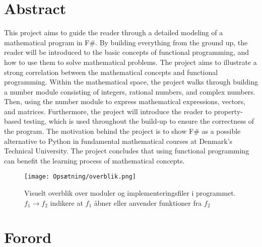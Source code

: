 \documentclass{article}
\newcommand{\newchapter}{
    \cleardoublepage
    \ifthenelse{\isodd{\value{page}}}{}{\hbox{}\newpage}
}
\begin{document}

\pagestyle{plain}

\section*{Abstract}
This project aims to guide the reader through a detailed modeling of a mathematical program in F\#. By building everything from the ground up, the reader will be introduced to the basic concepts of functional programming, and how to use them to solve mathematical problems. The project aims to illustrate a strong correlation between the mathematical concepts and functional programming. Within the mathematical space, the project walks through building a number module consisting of integers, rational numbers, and complex numbers. Then, using the number module to express mathematical expressions, vectors, and matrices. Furthermore, the project will introduce the reader to property-based testing, which is used throughout the build-up to ensure the correctness of the program. The motivation behind the project is to show F\# as a possible alternative to Python in fundamental mathematical courses at Denmark's Technical University. The project concludes that using functional programming can benefit the learning process of mathematical concepts.




\newpage
\begin{figure}[h]
    \centering
    \texttt{[image: Opsætning/overblik.png]}
    \caption{Visuelt overblik over moduler og implementeringsfiler i programmet. $f_1 \to f_2$ indikere at $f_1$ åbner eller anvender funktioner fra $f_2$}
    \label{fig:svg_example}
\end{figure}

\newchapter
\section*{Forord}


\newchapter
\tableofcontents
\newchapter

\newchapter

\newchapter

\newchapter

\newchapter

\newchapter


\newchapter

\newchapter




\newpage
\printbibliography

\newpage

\end{document}
